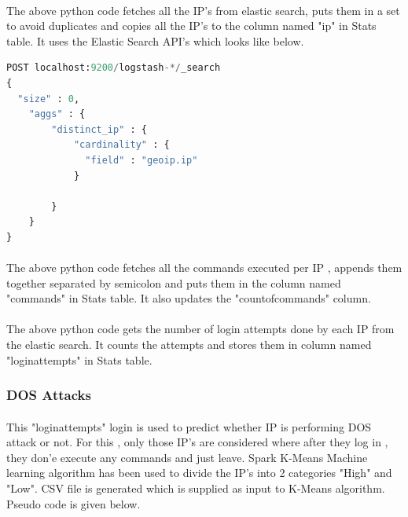 \documentclass{report}
\begin{document}


\paragraph{}
The above python code fetches all the IP's from elastic search, puts them in a set to avoid duplicates and copies all the IP's to the column named "ip" in Stats table. It uses the Elastic Search API's which looks like below.

\begin{lstlisting}[language=Python, caption=Elastic Search API Request Sample,captionpos=top]
POST localhost:9200/logstash-*/_search
{
  "size" : 0,
    "aggs" : {
        "distinct_ip" : {
            "cardinality" : {
              "field" : "geoip.ip"
            }
          
        }
    }
}
\end{lstlisting}




\paragraph{}
The above python code fetches all the commands executed per IP , appends them together separated by semicolon and puts them in the column named "commands" in Stats table. It also updates the "countofcommands" column.



\paragraph{}
The above python code gets the number of login attempts done by each IP from the elastic search. It counts the attempts and stores them in column named "loginattempts" in Stats table. 

\subsubsection{DOS Attacks}
\paragraph{}
This "loginattempts" login is used to predict whether IP is performing DOS attack or not. For this , only those IP's are considered where after they log in , they don'e execute any commands and just leave. Spark K-Means Machine learning algorithm has been used to divide the IP's into 2 categories "High" and "Low". CSV file is generated  which is supplied as input to K-Means algorithm. Pseudo code is given below.
\end{document}
